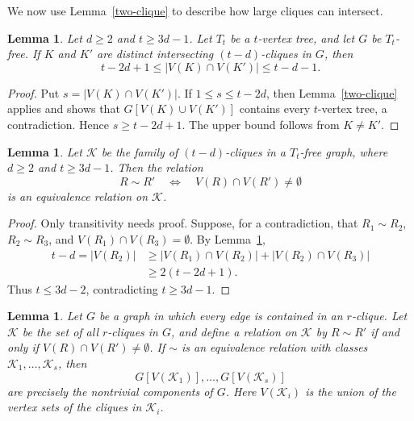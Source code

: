 \documentclass[11pt,a4paper]{article}
\newtheorem{lemma}[theorem]{Lemma}
\newcommand{\cl}{\mathcal K}
\begin{document}
We now use Lemma~\ref{two-clique} to describe how large cliques can intersect.

\begin{lemma}\label{large-overlap}
Let \(d\ge2\) and \(t\ge 3d-1\). Let \(T_t\) be a \(t\)-vertex tree, and let \(G\) be \(T_t\)-free. If \(K\) and \(K'\) are distinct intersecting \((t-d)\)-cliques in \(G\), then
\[
t-2d+1\le |V(K)\cap V(K')|\le t-d-1.
\]
\end{lemma}

\begin{proof}
Put \(s=|V(K)\cap V(K')|\). If \(1\le s\le t-2d\), then Lemma~\ref{two-clique} applies and shows that \(G[V(K)\cup V(K')]\) contains every \(t\)-vertex tree, a contradiction. Hence \(s\ge t-2d+1\). The upper bound follows from \(K\ne K'\).
\end{proof}

\begin{lemma}\label{large-transitivity}
Let \(\cl\) be the family of \((t-d)\)-cliques in a \(T_t\)-free graph, where \(d\ge2\) and \(t\ge3d-1\). Then the relation
\[
R\sim R'
\quad\Longleftrightarrow\quad
V(R)\cap V(R')\ne\emptyset
\]
is an equivalence relation on \(\cl\).
\end{lemma}

\begin{proof}
Only transitivity needs proof. Suppose, for a contradiction, that \(R_1\sim R_2\), \(R_2\sim R_3\), and \(V(R_1)\cap V(R_3)=\emptyset\). By Lemma~\ref{large-overlap},
\[
\begin{aligned}
t-d=|V(R_2)|
&\ge |V(R_1)\cap V(R_2)|+|V(R_2)\cap V(R_3)|\\
&\ge2(t-2d+1).
\end{aligned}
\]
Thus \(t\le3d-2\), contradicting \(t\ge3d-1\).
\end{proof}








\begin{lemma}\label{pg}
Let \(G\) be a graph in which every edge is contained in an \(r\)-clique. Let \(\cl\) be the set of all \(r\)-cliques in \(G\), and define a relation on \(\cl\) by \(R\sim R'\) if and only if \(V(R)\cap V(R')\ne\emptyset\). If \(\sim\) is an equivalence relation with classes \(\cl_1,\ldots,\cl_s\), then
\[
G[V(\cl_1)],\ldots,G[V(\cl_s)]
\]
are precisely the nontrivial components of \(G\). Here \(V(\cl_i)\) is the union of the vertex sets of the cliques in \(\cl_i\).
\end{lemma}
\end{document}
